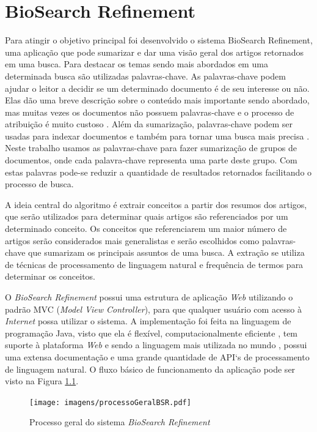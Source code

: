 \chapter{BioSearch Refinement}

Para atingir o objetivo principal foi desenvolvido o sistema BioSearch Refinement, uma aplicação que pode sumarizar e dar uma visão geral dos artigos retornados em uma busca. Para destacar os temas sendo mais abordados em uma determinada busca são utilizadas palavras-chave. As palavras-chave podem ajudar o leitor a decidir se um determinado documento é de seu interesse ou não. Elas dão uma breve descrição sobre o conteúdo mais importante sendo abordado, mas muitas vezes os documentos não possuem palavras-chave e o processo de atribuição é muito custoso \cite{Lui2007}. Além da sumarização, palavras-chave podem ser usadas para indexar documentos e também para tornar uma busca mais precisa \cite{Turney1999}. Neste trabalho usamos as palavras-chave para fazer sumarização de grupos de documentos, onde cada palavra-chave representa uma parte deste grupo. Com estas palavras pode-se reduzir a quantidade de resultados retornados facilitando o processo de busca.

A ideia central do algoritmo é extrair  conceitos a partir dos resumos dos artigos, que serão utilizados para determinar quais artigos são referenciados por um determinado conceito. Os conceitos que referenciarem um maior número de artigos serão considerados mais generalistas e serão escolhidos como palavras-chave que sumarizam os principais assuntos de uma busca. A extração se utiliza de técnicas de processamento de linguagem natural e frequência de termos para determinar os conceitos.

O \emph{BioSearch Refinement} possui uma estrutura de aplicação \emph{Web} utilizando o padrão MVC (\emph{Model View Controller}), para que qualquer usuário com acesso à \emph{Internet} possa utilizar o sistema. A implementação foi feita na linguagem de programação Java, visto que ela é flexível, computacionalmente eficiente \cite{Oracle2010}, tem suporte à plataforma \emph{Web} e sendo a linguagem mais utilizada no mundo \cite{TIOBE2011}, possui uma extensa documentação e uma grande quantidade de API`s de processamento de linguagem natural. O fluxo básico de funcionamento da aplicação pode ser visto na Figura \ref{fig:1}.

\begin{figure}[h!]
    \center
    \texttt{[image: imagens/processoGeralBSR.pdf]}
    \caption{Processo geral do sistema \emph{BioSearch Refinement} \label{fig:1}} 
\end{figure}

